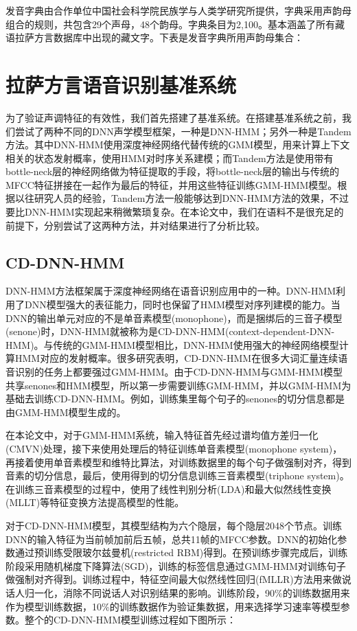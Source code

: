 发音字典由合作单位中国社会科学院民族学与人类学研究所提供，字典采用声韵母组合的规则，共包含29个声母，48个韵母。字典条目为2,100。基本涵盖了所有藏语拉萨方言数据库中出现的藏文字。下表是发音字典所用声韵母集合：{\color{red}{添加拉萨声韵母集合}}
\section{拉萨方言语音识别基准系统}
为了验证声调特征的有效性，我们首先搭建了基准系统。在搭建基准系统之前，我们尝试了两种不同的DNN声学模型框架，一种是DNN-HMM；另外一种是Tandem方法。其中DNN-HMM使用深度神经网络代替传统的GMM模型，用来计算上下文相关的状态发射概率，使用HMM对时序关系建模；而Tandem方法是使用带有bottle-neck层的神经网络做为特征提取的手段，将bottle-neck层的输出与传统的MFCC特征拼接在一起作为最后的特征，并用这些特征训练GMM-HMM模型。根据以往研究人员的经验，Tandem方法一般能够达到DNN-HMM方法的效果，不过要比DNN-HMM实现起来稍微繁琐复杂。在本论文中，我们在语料不是很充足的前提下，分别尝试了这两种方法，并对结果进行了分析比较。
\subsection{CD-DNN-HMM}
DNN-HMM方法框架属于深度神经网络在语音识别应用中的一种。DNN-HMM利用了DNN模型强大的表征能力，同时也保留了HMM模型对序列建模的能力。当DNN的输出单元对应的不是单音素模型(monophone)，而是捆绑后的三音子模型(senone)时，DNN-HMM就被称为是CD-DNN-HMM(context-dependent-DNN-HMM)。与传统的GMM-HMM模型相比，DNN-HMM使用强大的神经网络模型计算HMM对应的发射概率。很多研究表明，CD-DNN-HMM在很多大词汇量连续语音识别的任务上都要强过GMM-HMM。由于CD-DNN-HMM与GMM-HMM模型共享senones和HMM模型，所以第一步需要训练GMM-HMM，并以GMM-HMM为基础去训练CD-DNN-HMM。例如，训练集里每个句子的senones的切分信息都是由GMM-HMM模型生成的。

在本论文中，对于GMM-HMM系统，输入特征首先经过谱均值方差归一化(CMVN)处理，接下来使用处理后的特征训练单音素模型(monophone system)，再接着使用单音素模型和维特比算法，对训练数据里的每个句子做强制对齐，得到音素的切分信息，最后，使用得到的切分信息训练三音素模型(triphone system)。在训练三音素模型的过程中，使用了线性判别分析(LDA)和最大似然线性变换(MLLT)等特征变换方法提高模型的性能。

对于CD-DNN-HMM模型，其模型结构为六个隐层，每个隐层2048个节点。训练DNN的输入特征为当前帧加前后五帧，总共11帧的MFCC参数。DNN的初始化参数通过预训练受限玻尔兹曼机(restricted RBM)得到。在预训练步骤完成后，训练阶段采用随机梯度下降算法(SGD)，训练的标签信息通过GMM-HMM对训练句子做强制对齐得到。训练过程中，特征空间最大似然线性回归(fMLLR)方法用来做说话人归一化，消除不同说话人对识别结果的影响。训练阶段，90\%的训练数据用来作为模型训练数据，10\%的训练数据作为验证集数据，用来选择学习速率等模型参数。整个的CD-DNN-HMM模型训练过程如下图所示：{\color{red}{补充期刊论文图1}}
